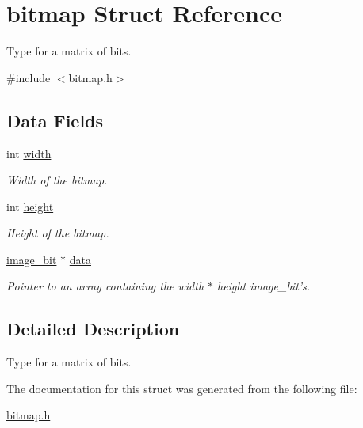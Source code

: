 \hypertarget{structbitmap}{
\section{bitmap Struct Reference}
\label{structbitmap}
}


Type for a matrix of bits.  




{\ttfamily \#include $<$bitmap.h$>$}

\subsection*{Data Fields}
\begin{DoxyCompactItemize}
\item 
\hypertarget{structbitmap_a4ce73692bd5429f0dc54e2b542af9270}{
int \hyperlink{structbitmap_a4ce73692bd5429f0dc54e2b542af9270}{width}}
\label{structbitmap_a4ce73692bd5429f0dc54e2b542af9270}

\begin{DoxyCompactList}\small\item\em Width of the bitmap. \end{DoxyCompactList}\item 
\hypertarget{structbitmap_a6e2342e52df0eb9e5048f85515498adf}{
int \hyperlink{structbitmap_a6e2342e52df0eb9e5048f85515498adf}{height}}
\label{structbitmap_a6e2342e52df0eb9e5048f85515498adf}

\begin{DoxyCompactList}\small\item\em Height of the bitmap. \end{DoxyCompactList}\item 
\hypertarget{structbitmap_a6cfd9d4b731895e2ebd1d9524dc7c2a7}{
\hyperlink{bitmap_8h_abb0a6c6bdf6faffa9e3773e1d687d67b}{image\_\-bit} $\ast$ \hyperlink{structbitmap_a6cfd9d4b731895e2ebd1d9524dc7c2a7}{data}}
\label{structbitmap_a6cfd9d4b731895e2ebd1d9524dc7c2a7}

\begin{DoxyCompactList}\small\item\em Pointer to an array containing the width $\ast$ height image\_\-bit's. \end{DoxyCompactList}\end{DoxyCompactItemize}


\subsection{Detailed Description}
Type for a matrix of bits. 

The documentation for this struct was generated from the following file:\begin{DoxyCompactItemize}
\item 
\hyperlink{bitmap_8h}{bitmap.h}\end{DoxyCompactItemize}
